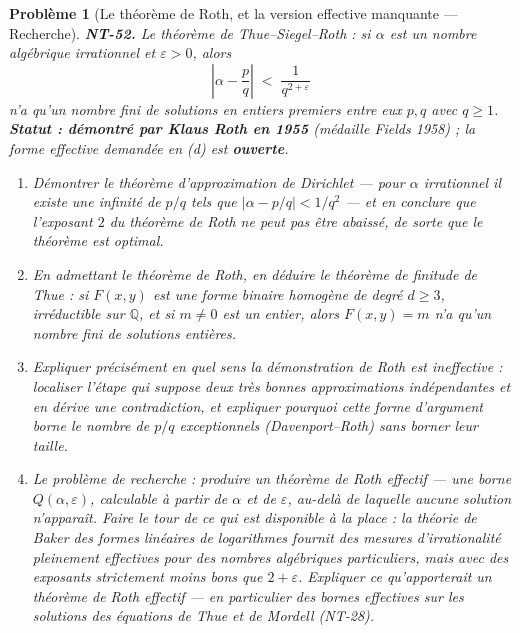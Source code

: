 \documentclass[11pt]{article}
\newtheorem{problem}{Problème}
\begin{document}
\begin{problem}[{Le théorème de Roth, et la version effective manquante --- Recherche}]
\textbf{NT-52.} Le théorème de Thue--Siegel--Roth : si $ \alpha $ est un nombre algébrique
irrationnel et $ \varepsilon > 0 $, alors
\[ \left| \alpha - \frac{p}{q} \right| \;<\; \frac{1}{q^{2+\varepsilon}} \]
n'a qu'un nombre fini de solutions en entiers premiers entre eux $ p, q $ avec $ q \ge 1 $.
\textbf{Statut : démontré par Klaus Roth en 1955} (médaille Fields 1958) ; la forme effective demandée
en (d) est \textbf{ouverte}.
\begin{enumerate}
\item[(a)] Démontrer le théorème d'approximation de Dirichlet --- pour $ \alpha $ irrationnel il existe une
infinité de $ p/q $ tels que $ \left| \alpha - p/q \right| < 1/q^2 $ --- et en conclure que
l'exposant $ 2 $ du théorème de Roth ne peut pas être abaissé, de sorte que le théorème est
optimal.
\item[(b)] En admettant le théorème de Roth, en déduire le théorème de finitude de Thue : si $ F(x,y) $ est
une forme binaire homogène de degré $ d \ge 3 $, irréductible sur $ \mathbb{Q} $, et si
$ m \ne 0 $ est un entier, alors $ F(x, y) = m $ n'a qu'un nombre fini de solutions
entières.
\item[(c)] Expliquer précisément en quel sens la démonstration de Roth est \textit{ineffective} : localiser
l'étape qui suppose deux très bonnes approximations indépendantes et en dérive une contradiction, et
expliquer pourquoi cette forme d'argument borne le \textit{nombre} de $ p/q $ exceptionnels
(Davenport--Roth) sans borner leur taille.
\item[(d)] Le problème de recherche : produire un théorème de Roth effectif --- une borne $ Q(\alpha,
\varepsilon) $, calculable à partir de $ \alpha $ et de $ \varepsilon $, au-delà de laquelle
aucune solution n'apparaît. Faire le tour de ce qui est disponible à la place : la théorie de Baker
des formes linéaires de logarithmes fournit des mesures d'irrationalité pleinement effectives pour
des nombres algébriques particuliers, mais avec des exposants strictement moins bons que
$ 2 + \varepsilon $. Expliquer ce qu'apporterait un théorème de Roth effectif --- en particulier des
bornes effectives sur les solutions des équations de Thue et de Mordell
(NT-28).
\end{enumerate}

\end{problem}
\end{document}
